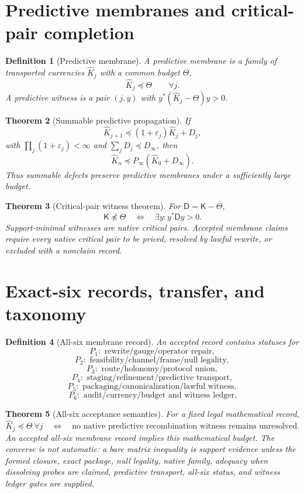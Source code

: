 \documentclass[11pt]{article}
\newtheorem{theorem}{Theorem}[section]
\newtheorem{definition}[theorem]{Definition}
\newcommand{\K}{\mathsf K}
\newcommand{\Loewner}{\preceq}
\begin{document}
\section{Predictive membranes and critical-pair completion}

\begin{definition}[Predictive membrane]
A predictive membrane is a family of transported currencies \(\widehat K_j\) with a common budget \(\Theta\),
\[
  \widehat K_j\Loewner\Theta\qquad\forall j.
\]
A predictive witness is a pair \((j,y)\) with \(y^*(\widehat K_j-\Theta)y>0\).
\end{definition}

\begin{theorem}[Summable predictive propagation]
If
\[
  \widehat K_{j+1}\Loewner(1+\varepsilon_j)\widehat K_j+D_j,
\]
with \(\prod_j(1+\varepsilon_j)<\infty\) and \(\sum_jD_j\Loewner D_\infty\), then
\[
  \widehat K_n\Loewner P_\infty(\widehat K_0+D_\infty).
\]
Thus summable defects preserve predictive membranes under a sufficiently large budget.
\end{theorem}

\begin{theorem}[Critical-pair witness theorem]
For \(\mathsf D=\K-\Theta\),
\[
  \K\npreceq\Theta\quad\Longleftrightarrow\quad\exists y:y^*\mathsf Dy>0.
\]
Support-minimal witnesses are native critical pairs.  Accepted membrane claims require every native critical pair to be priced, resolved by lawful rewrite, or excluded with a nonclaim record.
\end{theorem}

\section{Exact-six records, transfer, and taxonomy}

\begin{definition}[All-six membrane record]
An accepted record contains statuses for
\[
P_1:\text{ rewrite/gauge/operator repair},
\]
\[
P_2:\text{ feasibility/channel/frame/null legality},
\]
\[
P_3:\text{ route/holonomy/protocol union},
\]
\[
P_4:\text{ staging/refinement/predictive transport},
\]
\[
P_5:\text{ packaging/canonicalization/lawful witness},
\]
\[
P_6:\text{ audit/currency/budget and witness ledger}.
\]
\end{definition}

\begin{theorem}[All-six acceptance semantics]
For a fixed legal mathematical record,
\[
  \widehat K_j\Loewner\Theta\ \forall j
  \quad\Longleftrightarrow\quad
  \text{no native predictive recombination witness remains unresolved.}
\]
An accepted all-six membrane record implies this mathematical budget.  The converse is not automatic: a bare matrix inequality is support evidence unless the formed closure, exact package, null legality, native family, adequacy when dissolving probes are claimed, predictive transport, all-six status, and witness ledger gates are supplied.
\end{theorem}
\end{document}
